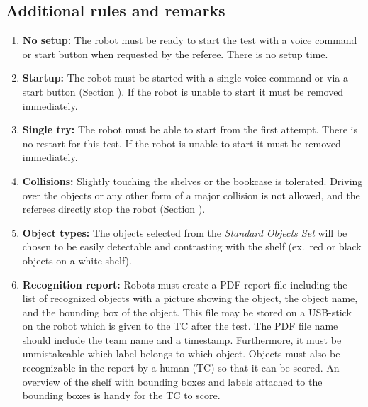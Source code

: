 \subsection{Additional rules and remarks}
\begin{enumerate}
\item \textbf{No setup:} The robot must be ready to start the test with a voice command or start button when requested by the referee. There is no setup time.
\item \textbf{Startup:} The robot must be started with a single voice command or via a start button (Section ). If the robot is unable to start it must be removed immediately.
\item \textbf{Single try:} The robot must be able to start from the first attempt. There is no restart for this test. If the robot is unable to start it must be removed immediately.
\item \textbf{Collisions:} Slightly touching the shelves or the bookcase is tolerated. Driving over the objects or any other form of a major collision is not allowed, and the referees directly stop the robot (Section ).
\item \textbf{Object types:} The objects selected from the \textit{Standard Objects Set} will be chosen to be easily detectable and contrasting with the shelf (ex.~red or black objects on a white shelf).
\item \textbf{Recognition report:} Robots must create a PDF report file including the list of recognized objects with a picture showing the object, the object name, and the bounding box of the object.
  This file may be stored on a USB-stick on the robot which is given to the TC after the test. The PDF file name should include the team name and a timestamp. 
  Furthermore, it must be unmistakeable which label belongs to which object. Objects must also be recognizable in the report by a human (TC) so that it can be scored. 
  An overview of the shelf with bounding boxes and labels attached to the bounding boxes is handy for the TC to score. 
\end{enumerate}

